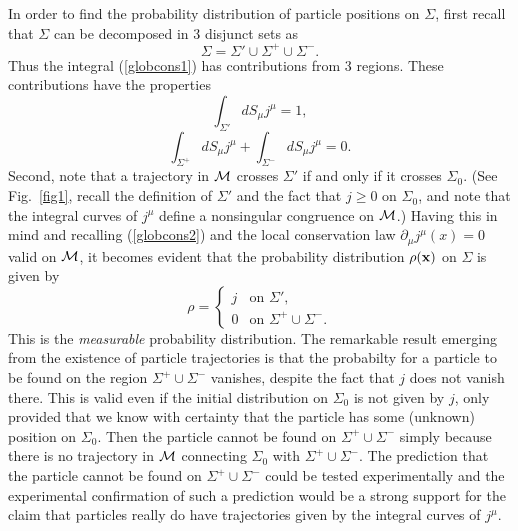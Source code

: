 \documentclass[11pt]{article}
\begin{document}
In order to find the probability distribution of particle positions 
on $\Sigma$, first recall that $\Sigma$ can be decomposed in 
3 disjunct sets as
\begin{equation}
\Sigma=\Sigma' \cup \Sigma^+ \cup \Sigma^- .
\end{equation}
Thus the integral (\ref{globcons1}) has contributions from 3 regions. 
These contributions have the properties
\begin{equation}\label{globcons2}
 \displaystyle\int_{\Sigma'} dS_{\mu}j^{\mu}=1, 
\end{equation}
\begin{equation}
 \displaystyle\int_{\Sigma^+} dS_{\mu}j^{\mu} + 
\displaystyle\int_{\Sigma^-} dS_{\mu}j^{\mu}=0. 
\end{equation}
Second, note that a trajectory in ${\cal M}$ crosses $\Sigma'$ if and only 
if it crosses $\Sigma_0$. (See Fig.~\ref{fig1}, recall the definition 
of $\Sigma'$ and the fact that  
$j\geq 0$ on $\Sigma_0$, and note that the integral 
curves of $j^{\mu}$ define a nonsingular congruence on ${\cal M}$.)  
Having this in mind and recalling (\ref{globcons2}) and the 
local conservation law $\partial_{\mu}j^{\mu}(x)=0$ valid on ${\cal M}$, 
it becomes evident
that the probability distribution $\rho({\bf x})$ on $\Sigma$ is given by
\begin{equation}\label{probdis}
\rho=\left\{
\begin{array}{ll}
j & \mbox{on $\Sigma'$}, \\
0 & \mbox{on $\Sigma^+\cup\Sigma^-$}.
\end{array}  
\right.
\end{equation}
%
This is the {\em measurable} probability distribution.
%
The remarkable result emerging from the existence of particle trajectories
is that the probabilty for a particle to be found on the region  
$\Sigma^+\cup\Sigma^-$ vanishes, despite the fact that $j$ does not 
vanish there. This is valid even if the initial distribution on 
$\Sigma_0$ is not given by $j$, only provided that we know 
with certainty that the particle has some 
(unknown) position on $\Sigma_0$. 
Then the particle cannot be found on $\Sigma^+\cup\Sigma^-$ simply because 
there is no trajectory in ${\cal M}$ connecting $\Sigma_0$ with 
$\Sigma^+\cup\Sigma^-$.  
The prediction that the particle cannot be found on $\Sigma^+\cup\Sigma^-$
could be tested experimentally and the experimental confirmation
of such a prediction would be a strong support 
for the claim that particles 
really do have trajectories given by the integral curves of $j^{\mu}$.
    
\end{document}
